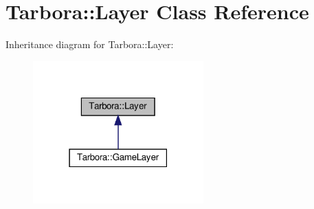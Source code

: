 \hypertarget{classTarbora_1_1Layer}{}\section{Tarbora\+:\+:Layer Class Reference}
\label{classTarbora_1_1Layer}


Inheritance diagram for Tarbora\+:\+:Layer\+:\nopagebreak
\begin{figure}[H]
\begin{center}
\leavevmode
\includegraphics[width=186pt]{classTarbora_1_1Layer__inherit__graph}
\end{center}
\end{figure}
